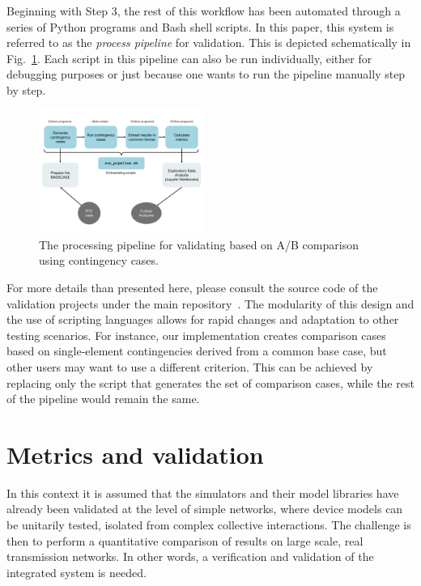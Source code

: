 \documentclass[conference]{IEEEtran}
\begin{document}
Beginning with Step 3, the rest of this workflow has been automated through a
series of Python programs and Bash shell scripts. In this paper, this system is referred to as the \emph{process pipeline} for validation. This is depicted
schematically in Fig.~\ref{fig:pipeline1}. Each script in this pipeline can
also be run individually, either for debugging purposes or just because one
wants to run the pipeline manually step by step.

\begin{figure}
  \centering
  \includegraphics[width=0.48\textwidth]{figs/pipeline}
  \caption{The processing pipeline for validating based on A/B comparison using
    contingency cases.}
  \label{fig:pipeline1}
\end{figure}

For more details than presented here, please consult the source code
of the validation projects under the main repository~\cite{DwoGitRepos}.
The modularity of this design and the use of scripting languages allows for
rapid changes and adaptation to other testing scenarios. For instance, our
implementation creates comparison cases based on single-element contingencies
derived from a common base case, but other users may want to use a different
criterion. This can be achieved by replacing only the script that generates the
set of comparison cases, while the rest of the pipeline would remain the same.




\section{Metrics and validation}
\label{sec:metrics}

In this context it is assumed that the simulators and their model libraries have
already been validated at the level of simple networks, where device models can be unitarily tested, isolated from complex
collective interactions.  The challenge is then to perform a quantitative
comparison of results on large scale, real transmission networks. In other
words, a verification and validation of the integrated system is needed.
\end{document}
